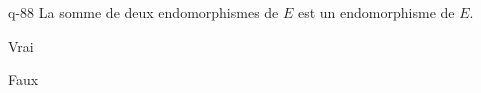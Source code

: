 \begin{truefalse}{q-88}
La somme de deux endomorphismes de $E$ est un endomorphisme de $E$.
\item* Vrai
\item Faux
\end{truefalse}

